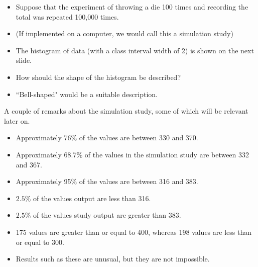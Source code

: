 \documentclass[]{report}
\begin{document}

\begin{itemize}
	\item Suppose that the experiment of throwing a die 100 times and recording the total was repeated 100,000 times.
	\item (If implemented on a computer, we would call this a simulation study)
	\item The histogram of data (with a class interval width of 2) is shown on the next slide.
	\item How should the shape of the histogram be described?
	\item ``Bell-shaped" would be a suitable description.
\end{itemize}


A couple of remarks about the simulation study, some of which will be relevant later on.
\begin{itemize}
	\item Approximately 76\% of the values are between 330 and 370.
	\item Approximately 68.7\% of the values in the simulation study are between 332 and 367.
	\item Approximately 95\% of the values are between 316 and 383.
	\item $2.5\%$ of the values output are less than 316.
	\item $2.5\%$ of the values study output are greater than 383.
	\item 175 values are greater than or equal to 400, whereas 198 values are less than or equal to 300.
	\item Results such as these are unusual, but they are not impossible.
\end{itemize}








	
\newpage
\end{document}
